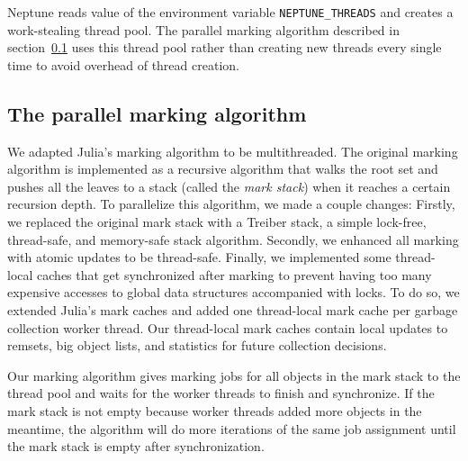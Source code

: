 Neptune reads value of the environment variable \texttt{NEPTUNE\_THREADS} and creates a work-stealing thread pool.
The parallel marking algorithm described in section~\ref{marking_algo} uses this thread pool rather than creating new threads every single time to avoid overhead of thread creation.

\subsection{The parallel marking algorithm}
\label{marking_algo}
We adapted Julia's marking algorithm to be multithreaded.
The original marking algorithm is implemented as a recursive algorithm that walks the root set and pushes all the leaves to a stack (called the \emph{mark stack}) when it reaches a certain recursion depth.
To parallelize this algorithm, we made a couple changes:
Firstly, we replaced the original mark stack with a Treiber stack, a simple lock-free, thread-safe, and memory-safe stack algorithm.
Secondly, we enhanced all marking with atomic updates to be thread-safe.
Finally, we implemented some thread-local caches that get synchronized after marking to prevent having too many expensive accesses to global data structures accompanied with locks.
To do so, we extended Julia's mark caches and added one thread-local mark cache per garbage collection worker thread.
Our thread-local mark caches contain local updates to remsets, big object lists, and statistics for future collection decisions.

Our marking algorithm gives marking jobs for all objects in the mark stack to the thread pool and waits for the worker threads to finish and synchronize.
If the mark stack is not empty because worker threads added more objects in the meantime, the algorithm will do more iterations of the same job assignment until the mark stack is empty after synchronization.

